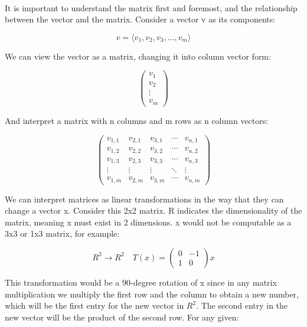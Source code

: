 \documentclass{article}
\begin{document}
\

It is important to understand the matrix first and foremost, and the relationship between the vector and the matrix. Consider a vector v as its components:

\begin{equation*}
v = \langle v_1, v_2, v_3, \dots, v_m \rangle
\end{equation*}

We can view the vector as a matrix, changing it into column vector form:

\begin{equation*}
\begin{pmatrix}
v_1 \\
v_2 \\
\vdots \\
v_m
\end{pmatrix}
\end{equation*}

And interpret a matrix with n columns and m rows as n column vectors:

\begin{equation*}
\begin{pmatrix}
v_{1,1} & v_{2,1} & v_{3,1} & \cdots & v_{n,1} \\
v_{1,2} & v_{2,2} & v_{3,2} & \cdots & v_{n,2} \\
v_{1,3} & v_{2,3} & v_{3,3} & \cdots & v_{n,3} \\
\vdots & \vdots & \vdots & \ddots & \vdots \\
v_{1,m} & v_{2,m} & v_{3,m} & \cdots & v_{n,m}
\end{pmatrix}
\end{equation*}

We can interpret matrices as linear transformations in the way that they can change a vector x. Consider this 2x2 matrix. R indicates the dimensionality of the matrix, meaning x must exist in 2 dimensions. x would not be computable as a 3x3 or 1x3 matrix, for example:

\begin{equation*}
R^2 \to R^2 \quad T(x) = \begin{pmatrix} 0 & -1 \\ 1 & 0 \end{pmatrix} x
\end{equation*}

This transformation would be a 90-degree rotation of x since in any matrix multiplication we multiply the first row and the column to obtain a new number, which will be the first entry for the new vector in $R^2$. The second entry in the new vector will be the product of the second row. For any given:
\end{document}
